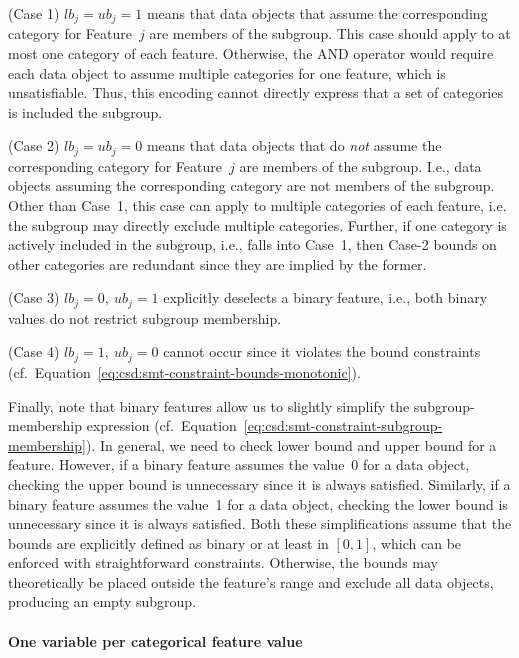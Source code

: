 \documentclass{article}
\theoremstyle{definition}
\begin{document}
(Case 1) $\mathit{lb}_j = \mathit{ub}_j = 1$ means that data objects that assume the corresponding category for Feature~$j$ are members of the subgroup.
This case should apply to at most one category of each feature.
Otherwise, the AND operator would require each data object to assume multiple categories for one feature, which is unsatisfiable.
Thus, this encoding cannot directly express that a set of categories is included the subgroup.

(Case 2) $\mathit{lb}_j = \mathit{ub}_j = 0$ means that data objects that do \emph{not} assume the corresponding category for Feature~$j$ are members of the subgroup.
I.e., data objects assuming the corresponding category are not members of the subgroup.
Other than Case~1, this case can apply to multiple categories of each feature, i.e. the subgroup may directly exclude multiple categories.
Further, if one category is actively included in the subgroup, i.e., falls into Case~1, then Case-2 bounds on other categories are redundant since they are implied by the former.

(Case 3) $\mathit{lb}_j = 0,~\mathit{ub}_j = 1$ explicitly deselects a binary feature, i.e., both binary values do not restrict subgroup membership.

(Case 4) $\mathit{lb}_j = 1,~\mathit{ub}_j = 0$ cannot occur since it violates the bound constraints (cf.~Equation~\ref{eq:csd:smt-constraint-bounds-monotonic}).

Finally, note that binary features allow us to slightly simplify the subgroup-membership expression (cf.~Equation~\ref{eq:csd:smt-constraint-subgroup-membership}).
In general, we need to check lower bound and upper bound for a feature.
However, if a binary feature assumes the value~0 for a data object, checking the upper bound is unnecessary since it is always satisfied.
Similarly, if a binary feature assumes the value~1 for a data object, checking the lower bound is unnecessary since it is always satisfied.
Both these simplifications assume that the bounds are explicitly defined as binary or at least in $[0, 1]$, which can be enforced with straightforward constraints.
Otherwise, the bounds may theoretically be placed outside the feature's range and exclude all data objects, producing an empty subgroup.

\paragraph{One variable per categorical feature value}
\end{document}
